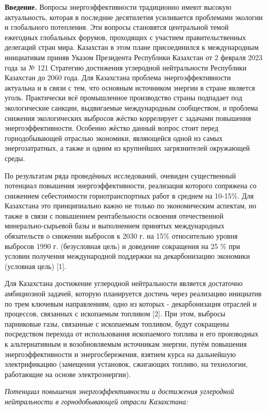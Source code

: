 \begin{multicols}{2}
{\bfseries Введение.} Вопросы энергоэффективности традиционно имеют высокую
актуальность, которая в последние десятилетия усиливается проблемами
экологии и глобального потепления. Эти вопросы становятся центральной
темой ежегодных глобальных форумов, проходящих с участием
правительственных делегаций стран мира. Казахстан в этом плане
присоединился к международным инициативам приняв Указом Президента
Республики Казахстан от 2 февраля 2023 года за № 121 Стратегию
достижения углеродной нейтральности Республики Казахстан до 2060 года.
Для Казахстана проблема энергоэффективности актуальна и в связи с тем,
что основным источником энергии в стране является уголь. Практически всё
промышленное производство страны подпадает под экологические санкции,
выдвигаемые международным сообществом, и проблема снижения экологических
выбросов жёстко коррелирует с задачами повышения энергоэффективности.
Особенно жёстко данный вопрос стоит перед горнодобывающей отраслью
экономики, являющейся одной из самых энергозатратных, а также и одним из
крупнейших загрязнителей окружающей среды.

По результатам ряда проведённых исследований, очевиден существенный
потенциал повышения энергоэффективности, реализация которого сопряжена
со снижением себестоимости горнотранспортных работ в среднем на 10-15\%.
Для Казахстана это принципиально важно не только по экономическим
аспектам, но также в связи с повышением рентабельности освоения
отечественной минерально-сырьевой базы и выполнением принятых
международных обязательств о снижении выбросов к 2030 г. на 15\%
относительно уровня выбросов 1990 г. (безусловная цель) и доведение
сокращения на 25 \% при условии получения международной поддержки на
декарбонизацию экономики (условная цель) {[}1{]}.

Для Казахстана достижение углеродной нейтральности является достаточно
амбициозной задачей, которую планируется достичь через реализацию
инициатив по трем ключевым направлениям, одно из которых -
декарбонизация отраслей и процессов, связанных с ископаемым топливом
{[}2{]}. При этом, выбросы парниковые газы, связанные с ископаемым
топливом, будут сокращены посредством перехода от использования
ископаемого топлива и его производных к альтернативным и возобновляемым
источникам энергии, путём повышения энергоэффективности и
энергосбережения, взятием курса на дальнейшую электрификацию (замещения
установок, сжигающих топливо, на технологии, работающие на основе
электроэнергии).

\emph{Потенциал повышения энергоэффективности и достижения углеродной
нейтральности в горнодобывающей отрасли Казахстана:}


\end{multicols}
